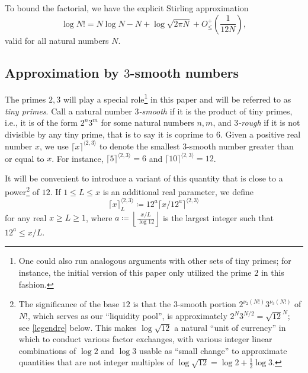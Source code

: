 \documentclass[12pt,a4paper,reqno]{amsart}
\numberwithin{equation}{section}
\theoremstyle{plain}
\theoremstyle{definition}
\begin{document}
To bound the factorial, we have the explicit Stirling approximation \cite{robbins}
\begin{equation}\label{stirling}
\log N! = N \log N - N + \log \sqrt{2\pi N} + O_\leq^+\left(\frac{1}{12N}\right),
\end{equation}
valid for all natural numbers $N$. 

\subsection{Approximation by \texorpdfstring{$3$}{3}-smooth numbers} 

The primes $2,3$ will play a special role\footnote{One could also run analogous arguments with other sets of tiny primes; for instance, the initial version \cite{tao} of this paper only utilized the prime $2$ in this fashion.} in this paper and will be referred to as \emph{tiny primes}. 
Call a natural number \emph{$3$-smooth} if it is the product of tiny primes, i.e., it is of the form $2^n 3^m$ for some natural numbers $n,m$, and \emph{$3$-rough} if it is not divisible by any tiny prime, that is to say it is coprime to $6$.  Given a positive real number $x$, we use $\lceil x \rceil^{\langle 2,3 \rangle}$ to denote the smallest $3$-smooth number greater than or equal to $x$.  For instance, $\lceil 5 \rceil^{\langle 2,3 \rangle} = 6$ and $\lceil 10 \rceil^{\langle 2,3 \rangle} = 12$.  

It will be convenient to introduce a variant of this quantity that is close to a power\footnote{The significance of the base $12$ is that the $3$-smooth portion $2^{\nu_2(N!)} 3^{\nu_3(N!)}$ of $N!$, which serves as our ``liquidity pool'', is approximately $2^N 3^{N/2} = \sqrt{12}^{N}$; see \eqref{legendre} below.  This makes $\log \sqrt{12}$ a natural ``unit of currency'' in which to conduct various factor exchanges, with various integer linear combinations of $\log 2$ and $\log 3$ usable as ``small change'' to approximate quantities that are not integer multiples of $\log \sqrt{12} = \log 2 + \frac{1}{2} \log 3$.} of $12$.  If $1 \leq L \leq x$ is an additional real parameter, we define
\begin{equation}\label{fancy-kappa-def}
  \lceil x \rceil^{\langle 2,3\rangle}_L \coloneqq 12^a \lceil x/12^a \rceil^{\langle 2,3 \rangle}
\end{equation}
for any real $x \geq L \geq 1$, where $a \coloneqq \left\lfloor \frac{x/L}{\log 12} \right\rfloor$ is the largest integer such that $12^a \leq x/L$.
\end{document}
